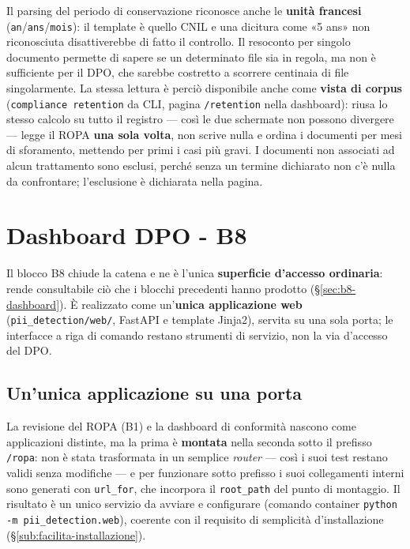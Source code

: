 Il parsing del periodo di conservazione riconosce anche le \textbf{unità francesi} (\texttt{an}/\texttt{ans}/\texttt{mois}): il template è quello CNIL e una dicitura come «5 ans» non riconosciuta disattiverebbe di fatto il controllo. Il resoconto per singolo documento permette di sapere se un determinato file sia in regola, ma non è sufficiente per il DPO, che sarebbe costretto a scorrere centinaia di file singolarmente. La stessa lettura è perciò disponibile anche come \textbf{vista di corpus} (\texttt{compliance retention} da CLI, pagina \texttt{/retention} nella dashboard): riusa lo stesso calcolo su tutto il registro --- così le due schermate non possono divergere --- legge il ROPA \textbf{una sola volta}, non scrive nulla e ordina i documenti per mesi di sforamento, mettendo per primi i casi più gravi. I documenti non associati ad alcun trattamento sono esclusi, perché senza un termine dichiarato non c'è nulla da confrontare; l'esclusione è dichiarata nella pagina.

\section{Dashboard DPO - B8}
\label{sec:impl-b8}

Il blocco B8 chiude la catena e ne è l'unica \textbf{superficie d'accesso ordinaria}: rende consultabile ciò che i blocchi precedenti hanno prodotto (§\ref{sec:b8-dashboard}). È realizzato come un'\textbf{unica applicazione web} (\texttt{pii\_detection/web/}, FastAPI e template Jinja2), servita su una sola porta; le interfacce a riga di comando restano strumenti di servizio, non la via d'accesso del DPO.

\subsection{Un'unica applicazione su una porta}
\label{sub:impl-b8-app}

La revisione del ROPA (B1) e la dashboard di conformità nascono come applicazioni distinte, ma la prima è \textbf{montata} nella seconda sotto il prefisso \texttt{/ropa}: non è stata trasformata in un semplice \emph{router} --- così i suoi test restano validi senza modifiche --- e per funzionare sotto prefisso i suoi collegamenti interni sono generati con \texttt{url\_for}, che incorpora il \texttt{root\_path} del punto di montaggio. Il risultato è un unico servizio da avviare e configurare (comando container \texttt{python -m pii\_detection.web}), coerente con il requisito di semplicità d'installazione (§\ref{sub:facilita-installazione}).

